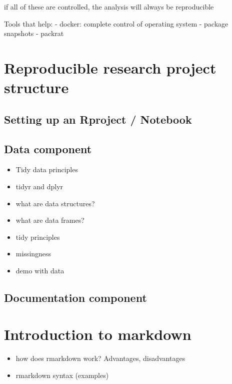 \documentclass[
]{book}
\providecommand{\tightlist}{%
  \setlength{\itemsep}{0pt}\setlength{\parskip}{0pt}}
\begin{document}
if all of these are controlled, the analysis will always be reproducible

Tools that help:
- docker: complete control of operating system
- package snapshots
- packrat

\hypertarget{reproducible-research-project-structure}{%
\chapter{Reproducible research project structure}\label{reproducible-research-project-structure}}

\hypertarget{setting-up-an-rproject-notebook}{%
\section{Setting up an Rproject / Notebook}\label{setting-up-an-rproject-notebook}}

\hypertarget{data-component}{%
\section{Data component}\label{data-component}}

\begin{itemize}
\item
  Tidy data principles
\item
  tidyr and dplyr
\item
  what are data structures?
\item
  what are data frames?
\item
  tidy principles
\item
  missingness
\item
  demo with data
\end{itemize}

\hypertarget{documentation-component}{%
\section{Documentation component}\label{documentation-component}}

\hypertarget{introduction-to-markdown}{%
\chapter{Introduction to markdown}\label{introduction-to-markdown}}

\begin{itemize}
\tightlist
\item
  how does rmarkdown work? Advantages, disadvantages
\item
  rmarkdown syntax (examples)
\end{itemize}
\end{document}
